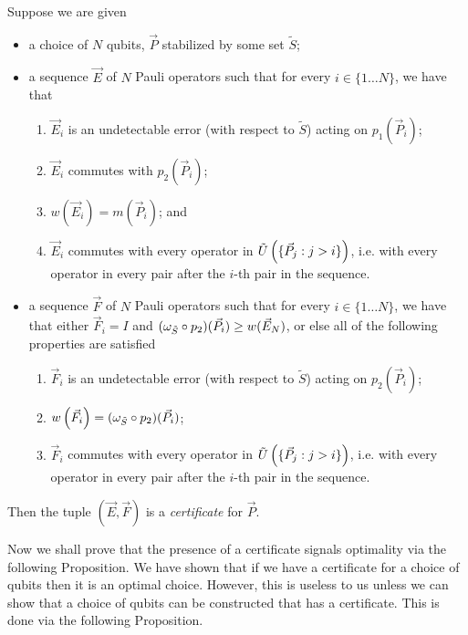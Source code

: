 \documentclass[twocolumn,showpacs,preprintnumbers,amsmath,amssymb,nofootinbib,pra,floatfix]{revtex4-1}
\newenvironment{definition}[1][Definition]{\begin{trivlist}
\item[\hskip \labelsep {\bfseries #1}]}{\end{trivlist}}
\newcommand{\lst}{\vec}
\newcommand{\set}{\tilde}
\begin{document}
\begin{definition}
Suppose we are given
\begin{itemize}
\item a choice of $N$ qubits, $\lst P$ stabilized by some set $\set S$;
\item a sequence $\lst E$ of $N$ Pauli operators such that for every $i\in\{1\dots N\}$, we have that
\begin{enumerate}
\item $\lst E_i$ is an undetectable error (with respect to $\set S$) acting on $p_1(\lst P_i)$;
\item $\lst E_i$ commutes with $p_2(\lst P_i)$;
\item $w(\lst E_i)=m(\lst P_i)$; and
\item $\lst E_i$ commutes with every operator in $\set U\paren{\{\lst P_j:j>i\}}$, i.e. with every operator in every pair after the $i$-th pair in the sequence.
\end{enumerate}
\item a sequence $\lst F$ of $N$ Pauli operators such that for every $i\in\{1\dots N\}$, we have that either $\lst F_i=I$ and $(\om_{\set S} \circ p_2)(\lst P_i) \ge w(\lst E_N)$, or else all of the following properties are satisfied
\begin{enumerate}
\item $\lst F_i$ is an undetectable error (with respect to $\set S$) acting on $p_2(\lst P_i)$;
\item $w\paren{\lst F_i}=(\om_{\set S} \circ p_2)(\lst P_i)$;
\item $\lst F_i$ commutes with every operator in $\set U\paren{\{\lst P_j:j>i\}}$, i.e. with every operator in every pair after the $i$-th pair in the sequence.
\end{enumerate}
\end{itemize}
Then the tuple $(\lst E,\lst F)$ is a \emph{certificate} for $\lst P$.
\end{definition}

Now we shall prove that the presence of a certificate signals optimality via the following Proposition.
We have shown that if we have a certificate for a choice of qubits then it is an optimal choice.  However, this is useless to us unless we can show that a choice of qubits can be constructed that has a certificate.  This is done via the following Proposition.
\end{document}
